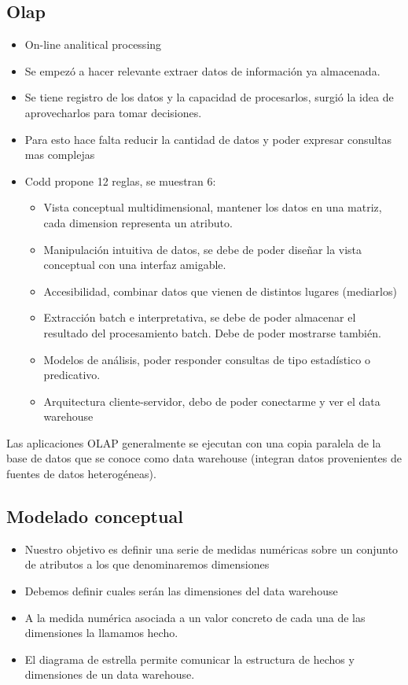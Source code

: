 \subsection*{Olap}
\begin{itemize}
\item On-line analitical processing
\item Se empezó a hacer relevante extraer datos de información ya almacenada.
\item Se tiene registro de los datos y la capacidad de procesarlos, surgió la idea de aprovecharlos para tomar decisiones.
\item Para esto hace falta reducir la cantidad de datos y poder expresar consultas mas complejas
\item Codd propone 12 reglas, se muestran 6:
    \begin{itemize}
    \item Vista conceptual multidimensional, mantener los datos en una matriz, cada dimension representa un atributo.
    \item Manipulación intuitiva de datos, se debe de poder diseñar la vista conceptual con una interfaz amigable.
    \item Accesibilidad, combinar datos que vienen de distintos lugares (mediarlos)
    \item Extracción batch e interpretativa, se debe de poder almacenar el resultado del procesamiento batch. Debe de poder mostrarse también.
    \item Modelos de análisis, poder responder consultas de tipo estadístico o predicativo.
    \item Arquitectura cliente-servidor, debo de poder conectarme y ver el data warehouse
    \end{itemize}
\end{itemize}


Las aplicaciones OLAP generalmente se ejecutan con una copia paralela de la base de datos que se conoce como data warehouse (integran datos provenientes de fuentes de datos heterogéneas).



\subsection*{Modelado conceptual}
\begin{itemize}
\item Nuestro objetivo es definir una serie de medidas numéricas sobre un conjunto de atributos a los que denominaremos dimensiones
\item Debemos definir cuales serán las dimensiones del data warehouse
\item A la medida numérica asociada a un valor concreto de cada una de las dimensiones la llamamos hecho.
\item El diagrama de estrella permite comunicar la estructura de hechos y dimensiones de un data warehouse.
\end{itemize}

